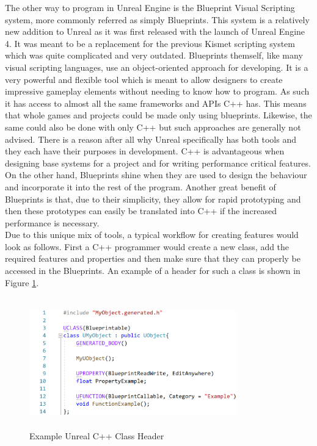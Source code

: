 The other way to program in Unreal Engine is the Blueprint Visual Scripting system, more commonly referred as simply Blueprints\cite{bib:UEBlueprints}. This system is a relatively new addition to Unreal as it was first released with the launch of Unreal Engine 4. It was meant to be a replacement for the previous Kismet scripting system which was quite complicated and very outdated\cite{bib:UEBlueChanges}. Blueprints themself, like many visual scripting languages, use an object-oriented approach for developing. It is a very powerful and flexible tool which is meant to allow designers to create impressive gameplay elements without needing to know how to program\cite{bib:UEBlueprints}. As such it has access to almost all the same frameworks and APIs C++ has. This means that whole games and projects could be made only using blueprints. Likewise, the same could also be done with only C++ but such approaches are generally not advised. There is a reason after all why Unreal specifically has both tools and they each have their purposes in development. C++ is advantageous when designing base systems for a project and for writing performance critical features. On the other hand, Blueprints shine when they are used to design the behaviour and incorporate it into the rest of the program. Another great benefit of Blueprints is that, due to their simplicity, they allow for rapid prototyping and then these prototypes can easily be translated into C++ if the increased performance is necessary.\\
Due to this unique mix of tools, a typical workflow for creating features would look as follows. First a C++ programmer would create a new class, add the required features and properties and then make sure that they can properly be accessed in the Blueprints. An example of a header for such a class is shown in Figure \ref{fig:ClassExample}.
\begin{figure}[htpb]
	\centering
	\includegraphics[width=0.8\textwidth,height=160pt]{fig/ClassExample3.png}
	\caption[Example Unreal C++ Class Header]{Example Unreal C++ Class Header\protect}
	\label{fig:ClassExample}
\end{figure}
